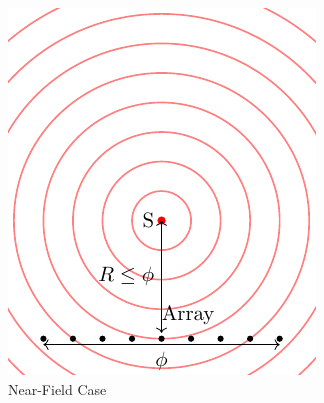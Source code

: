 
\begin{figure}
  \centering
  \begin{subfigure}[b]{0.45\textwidth}
    \centering
    \includegraphics[width=\textwidth]{NearField.pdf}
    \caption{Near-Field Case}
    \label{fig:y equals x}
  \end{subfigure}
  \hfill
  \begin{subfigure}[b]{0.45\textwidth}
    \centering

\end{subfigure}
\end{figure}
